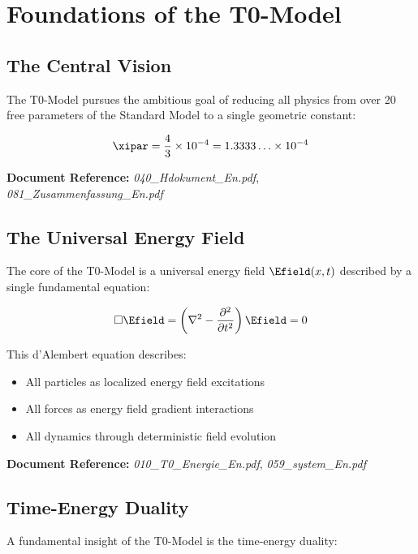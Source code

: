 \section{Foundations of the T0-Model}

\subsection{The Central Vision}

The T0-Model pursues the ambitious goal of reducing all physics from over 20 free parameters of the Standard Model to a single geometric constant:

\begin{equation}
	\xipar = \frac{4}{3} \times 10^{-4} = 1.3333\ldots \times 10^{-4}
\end{equation}

\textbf{Document Reference:} \textit{040\_Hdokument\_En.pdf}, \textit{081\_Zusammenfassung\_En.pdf}

\subsection{The Universal Energy Field}

The core of the T0-Model is a universal energy field $\Efield(x,t)$ described by a single fundamental equation:

\begin{equation}
	\square \Efield = \left(\nabla^2 - \frac{\partial^2}{\partial t^2}\right) \Efield = 0
\end{equation}

This d'Alembert equation describes:
\begin{itemize}
	\item All particles as localized energy field excitations
	\item All forces as energy field gradient interactions
	\item All dynamics through deterministic field evolution
\end{itemize}

\textbf{Document Reference:} \textit{010\_T0\_Energie\_En.pdf}, \textit{059\_system\_En.pdf}

\subsection{Time-Energy Duality}

A fundamental insight of the T0-Model is the time-energy duality:

